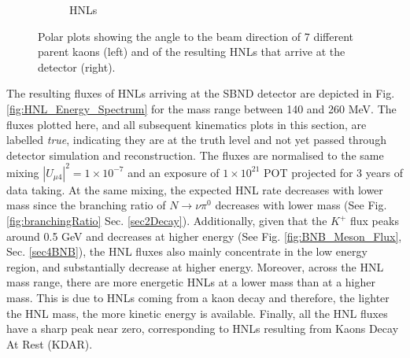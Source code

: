 \begin{figure}[htbp!]
\begin{subfigure}[b]{0.495\textwidth}
            \caption{HNLs}%
            \label{fig:hnl_angle2beam}
        \end{subfigure}
        \caption[Angle To The Beam Direction of Kaons and Resulting HNLs Polar Plots]{
	Polar plots showing the angle to the beam direction of 7 different parent kaons (left) and of the resulting HNLs that arrive at the detector (right).
	}
        \label{fig:kaon_hnl_angle2beam}
\end{figure}

The resulting fluxes of HNLs arriving at the SBND detector are depicted in Fig. \ref{fig:HNL_Energy_Spectrum} for the mass range between 140 and 260 MeV.
The fluxes plotted here, and all subsequent kinematics plots in this section, are labelled \textit{true}, indicating they are at the truth level and not yet passed through detector simulation and reconstruction.
The fluxes are normalised to the same mixing $|U_{\mu4}|^{2} = 1 \times 10^{-7}$ and an exposure of $1 \times 10^{21}$ POT projected for 3 years of data taking.
At the same mixing, the expected HNL rate decreases with lower mass since the branching ratio of $N \rightarrow \nu\pi^0$ decreases with lower mass (See Fig. \ref{fig:branchingRatio} Sec. \ref{sec2Decay}).
Additionally, given that the $K^{+}$ flux peaks around 0.5 GeV and decreases at higher energy (See Fig. \ref{fig:BNB_Meson_Flux}, Sec. \ref{sec4BNB}), the HNL fluxes also mainly concentrate in the low energy region, and substantially decrease at higher energy. 
Moreover, across the HNL mass range, there are more energetic HNLs at a lower mass than at a higher mass.
This is due to HNLs coming from a kaon decay and therefore, the lighter the HNL mass, the more kinetic energy is available.
Finally, all the HNL fluxes have a sharp peak near zero, corresponding to HNLs resulting from Kaons Decay At Rest (KDAR).

